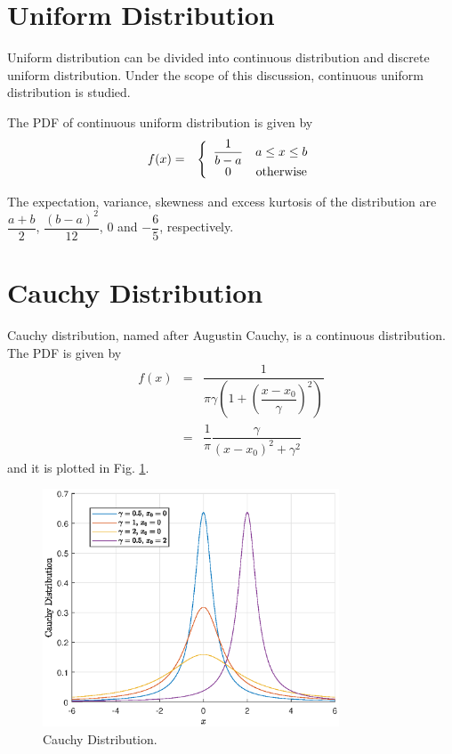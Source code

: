 \section{Uniform Distribution}

Uniform distribution can be divided into continuous distribution and discrete uniform distribution. Under the scope of this discussion, continuous uniform distribution is studied.

The PDF of continuous uniform distribution is given by
\begin{eqnarray}
  f(x) &=& \left\{\begin{array}{cc}
                    \dfrac{1}{b-a} & a \leq x \leq b \\
                    0 & \textup{otherwise}
                  \end{array}\right. \nonumber
\end{eqnarray}

The expectation, variance, skewness and excess kurtosis of the distribution are $\dfrac{a+b}{2}$, $\dfrac{(b-a)^2}{12}$, $0$ and $-\dfrac{6}{5}$, respectively.

\section{Cauchy Distribution}

Cauchy distribution, named after Augustin Cauchy, is a continuous distribution. The PDF is given by
\begin{eqnarray}
  f(x) &=& \dfrac{1}{\pi\gamma\left(1+\left(\dfrac{x-x_0}{\gamma}\right)^2\right)} \nonumber \\ &=& \dfrac{1}{\pi}\dfrac{\gamma}{(x-x_0)^2+\gamma^2} \nonumber
\end{eqnarray}
and it is plotted in Fig. \ref{fig:cauchy_pdf}.

\begin{figure}
	\centering
	\includegraphics[width=250pt]{chapters/ch-commonly-seen-distributions/figs/cauchy_pdf.eps}
	\caption{Cauchy Distribution.} \label{fig:cauchy_pdf}
\end{figure}

